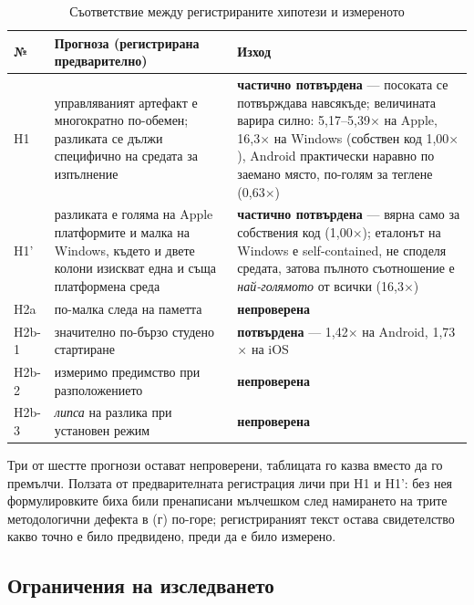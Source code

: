 \begin{table}[H]
\caption{Съответствие между регистрираните хипотези и измереното}
\label{tab:hypotheses}
\centering\small
\begin{tabular}{@{}L{1.4cm}L{6.0cm}L{6.2cm}@{}}
\hline
\textbf{№} & \textbf{Прогноза (регистрирана предварително)} & \textbf{Изход} \\
\hline
H1 & управляваният артефакт е многократно по-обемен; разликата се дължи специфично на средата за
     изпълнение &
     \textbf{частично потвърдена} --- посоката се потвърждава навсякъде; величината варира силно:
     5,17--5,39$\times$ на Apple, 16,3$\times$ на Windows (собствен код 1,00$\times$), Android
     практически наравно по заемано място, по-голям за теглене (0,63$\times$) \\
H1' & разликата е голяма на Apple платформите и малка на Windows, където и двете колони изискват
      една и съща платформена среда &
     \textbf{частично потвърдена} --- вярна само за собствения код (1,00$\times$); еталонът на
     Windows е self-contained, не споделя средата, затова пълното съотношение е
     \emph{най-голямото} от всички (16,3$\times$) \\
H2a & по-малка следа на паметта & \textbf{непроверена} \\
H2b-1 & значително по-бързо студено стартиране & \textbf{потвърдена} --- 1,42$\times$ на Android,
        1,73$\times$ на iOS \\
H2b-2 & измеримо предимство при разположението & \textbf{непроверена} \\
H2b-3 & \emph{липса} на разлика при установен режим & \textbf{непроверена} \\
\hline
\end{tabular}
\end{table}

Три от шестте прогнози остават непроверени, таблицата го казва вместо да го премълчи. Ползата от
предварителната регистрация личи при H1 и H1': без нея формулировките биха били пренаписани
мълчешком след намирането на трите методологични дефекта в (г) по-горе; регистрираният текст остава
свидетелство какво точно е било предвидено, преди да е било измерено.

\subsection{Ограничения на изследването}
\label{subsec:limitations}

